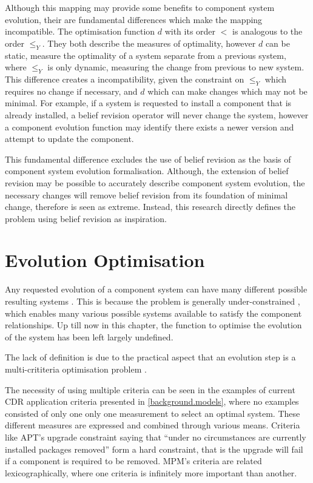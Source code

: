 Although this mapping may provide some benefits to component system evolution, their are fundamental differences which make the mapping incompatible.
The optimisation function $d$ with its order $<$ is analogous to the order $\leq_{Y}$.
They both describe the measures of optimality, however $d$ can be static, measure the optimality of a system separate from a previous system,
where $\leq_Y$ is only dynamic, measuring the change from previous to new system.
This difference creates a incompatibility, given the constraint on $\leq_Y$ which requires no change if necessary,
and $d$ which can make changes which may not be minimal.
For example, if a system is requested to install a component that is already installed, a belief revision operator will never change the system,
however a component evolution function may identify there exists a newer version and attempt to update the component.

This fundamental difference excludes the use of belief revision as the basis of component system evolution formalisation.
Although, the extension of belief revision may be possible to accurately describe component system evolution, 
the necessary changes will remove belief revision from its foundation of minimal change,
therefore is seen as extreme.
Instead, this research directly defines the problem using belief revision as inspiration.

\section{Evolution Optimisation}
\label{formal.opt}
Any requested evolution of a component system can have many different possible resulting systems \cite{leBerre2010}.
This is because the problem is generally under-constrained \cite{leberre2008}, which enables many various possible systems available to satisfy the component relationships.
Up till now in this chapter, the function to optimise the evolution of the system has been left largely undefined.

The lack of definition is due to the practical aspect that an evolution step is a multi-crititeria optimisation problem \cite{leBerre2010}. 

The necessity of using multiple criteria can be seen in the examples of current CDR application criteria presented in \ref{background.models},
where no examples consisted of only one only one measurement to select an optimal system.
These different measures are expressed and combined through various means.
Criteria like APT's upgrade constraint saying that ``under no circumstances are currently installed packages removed'' form a hard constraint,
that is the upgrade will fail if a component is required to be removed.
MPM's criteria are related lexicographically, where one criteria is infinitely more important than another.

